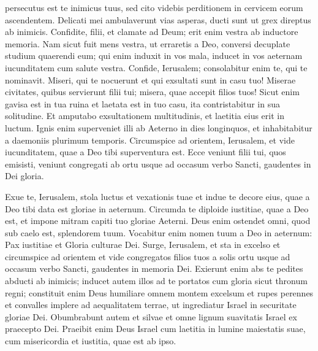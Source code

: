 \begin{biblechapter}
\begin{biblechapter}
\begin{biblechapter}
\begin{biblechapter}
 persecutus est te inimicus tuus,
 sed cito videbis perditionem
 in cervicem eorum ascendentem.
 \verse Delicati mei ambulaverunt vias asperas,
 ducti sunt ut grex direptus ab inimicis.
 \verse Confidite, filii, et clamate ad Deum;
 erit enim vestra ab inductore memoria.
 \verse Nam sicut fuit mens vestra, ut erraretis a Deo,
 conversi decuplate studium quaerendi eum;
 \verse qui enim induxit in vos mala,
 inducet in vos aeternam iucunditatem cum salute vestra.
 \verse Confide, Ierusalem;
 consolabitur enim te, qui te nominavit.
 \verse Miseri, qui te nocuerunt
 et qui exsultati sunt in casu tuo!
 \verse Miserae civitates, quibus servierunt filii tui;
 misera, quae accepit filios tuos!
 \verse Sicut enim gavisa est in tua ruina
 et laetata est in tuo casu,
 ita contristabitur in sua solitudine.
 \verse Et amputabo exsultationem multitudinis,
 et laetitia eius erit in luctum.
 \verse Ignis enim superveniet illi ab Aeterno
 in dies longinquos,
 et inhabitabitur a daemoniis plurimum temporis.
 \verse Circumspice ad orientem, Ierusalem,
 et vide iucunditatem, quae a Deo tibi superventura est.
 \verse Ecce veniunt filii tui, quos emisisti,
 veniunt congregati ab ortu usque ad occasum
 verbo Sancti, gaudentes in Dei gloria.
 
\begin{biblechapter}
\verse Exue te, Ierusalem, stola luctus et vexationis tuae
 et indue te decore eius,
 quae a Deo tibi data est gloriae in aeternum.
 \verse Circumda te diploide iustitiae, quae a Deo est,
 et impone mitram capiti tuo gloriae Aeterni.
 \verse Deus enim ostendet omni, quod sub caelo est,
 splendorem tuum.
 \verse Vocabitur enim nomen tuum a Deo in aeternum:
 Pax iustitiae et Gloria culturae Dei.
 \verse Surge, Ierusalem, et sta in excelso
 et circumspice ad orientem et vide congregatos filios tuos
 a solis ortu usque ad occasum
 verbo Sancti, gaudentes in memoria Dei.
 \verse Exierunt enim abs te pedites abducti ab inimicis;
 inducet autem illos ad te
 portatos cum gloria sicut thronum regni;
 \verse constituit enim Deus humiliare
 omnem montem excelsum et rupes perennes
 et convalles implere ad aequalitatem terrae,
 ut ingrediatur Israel in securitate gloriae Dei.
 \verse Obumbrabunt autem et silvae et omne lignum suavitatis
 Israel ex praecepto Dei.
 \verse Praeibit enim Deus Israel cum laetitia
 in lumine maiestatis suae,
 cum misericordia et iustitia,
 quae est ab ipso.
 

\end{biblechapter}
\end{biblechapter}
\end{biblechapter}
\end{biblechapter}
\end{biblechapter}
